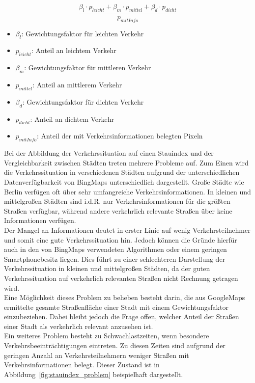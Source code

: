 \begin{equation}\label{eq:1}
\frac{\beta_l\cdot p_{leicht}+\beta_m\cdot p_{mittel}+\beta_d\cdot p_{dicht}}{p_{mit Info}}
\end{equation}
\begin{itemize}
\item $\beta_l$: Gewichtungsfaktor für leichten Verkehr
\item $p_{leicht}$: Anteil an leichtem Verkehr
\item $\beta_m$: Gewichtungsfaktor für mittleren Verkehr
\item $p_{mittel}$: Anteil an mittlerem Verkehr
\item $\beta_d$: Gewichtungsfaktor für dichten Verkehr
\item $p_{dicht}$: Anteil an dichtem Verkehr
\item $p_{mit Info}$: Anteil der mit Verkehrsinformationen belegten Pixeln
\end{itemize}

Bei der Abbildung der Verkehrssituation auf einen Stauindex und der Vergleichbarkeit zwischen Städten treten mehrere Probleme auf. Zum Einen wird die Verkehrssituation in verschiedenen Städten aufgrund der unterschiedlichen Datenverfügbarkeit von BingMaps unterschiedlich dargestellt. Große Städte wie Berlin verfügen oft über sehr umfangreiche Verkehrsinformationen. In kleinen und mittelgroßen Städten sind i.d.R. nur Verkehrsinformationen für die größten Straßen verfügbar, während andere verkehrlich relevante Straßen über keine Informationen verfügen.\\ Der Mangel an Informationen deutet in erster Linie auf wenig Verkehrsteilnehmer und somit eine gute Verkehrssituation hin. Jedoch können die Gründe hierfür auch in den von BingMaps verwendeten Algorithmen oder einem geringen Smartphonebesitz liegen. Dies führt zu einer schlechteren Darstellung der Verkehrssituation in kleinen und mittelgroßen Städten, da der guten Verkehrssituation auf verkehrlich relevanten Straßen nicht Rechnung getragen wird.\\  
Eine Möglichkeit dieses Problem zu beheben besteht darin, die aus GoogleMaps ermittelte gesamte Straßenfläche einer Stadt mit einem Gewichtungsfaktor einzubeziehen. Dabei bleibt jedoch die Frage offen, welcher Anteil der Straßen einer Stadt als verkehrlich relevant anzusehen ist.\\
Ein weiteres Problem besteht zu Schwachlastzeiten, wenn besondere Verkehrsbeeinträchtigungen eintreten. Zu diesen Zeiten sind aufgrund der geringen Anzahl an Verkehrsteilnehmern weniger Straßen mit Verkehrsinformationen belegt. Dieser Zustand ist in Abbildung~\ref{fig:stauindex_problem} beispielhaft dargestellt. 

